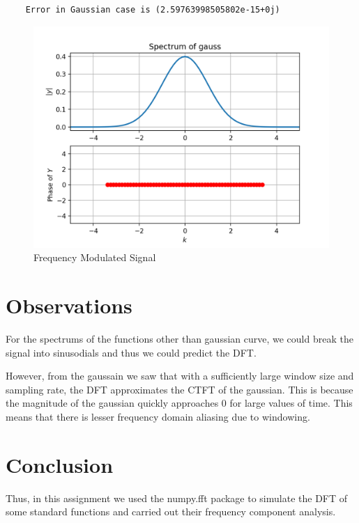 \documentclass[11pt, a4paper]{article}
\begin{document}
\begin{verbatim}
    Error in Gaussian case is (2.59763998505802e-15+0j)
\end{verbatim}
\begin{figure}[!tbh]
   	\centering
   	\includegraphics[scale=0.7]{gaussian.png}   
   	\caption{Frequency Modulated Signal}
   	\label{fig:Figure_1}
\end{figure}

\newpage
\section{Observations}
For the spectrums of the functions other than gaussian curve, we could break the signal into sinusodials and thus we could predict the DFT.\newline

However, from the gaussain we saw that with a sufficiently large window size and sampling rate, the DFT approximates the CTFT of the gaussian.
This is because the magnitude of the gaussian quickly approaches 0 for large values of time. This means that there is lesser frequency domain aliasing due to windowing.

\section{Conclusion}
Thus, in this assignment we used the numpy.fft package to simulate the DFT of some standard functions and carried out their frequency component analysis.
\end{document}
